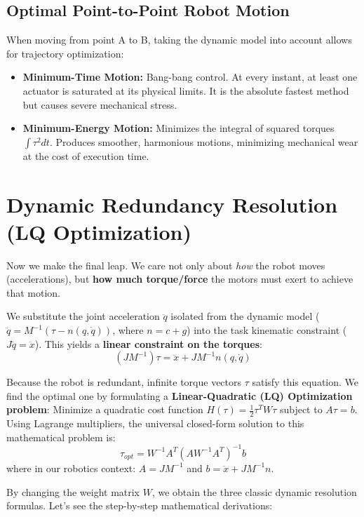 \documentclass[11pt,a4paper]{article}
\begin{document}
\subsection{Optimal Point-to-Point Robot Motion}
When moving from point A to B, taking the dynamic model into account allows for trajectory optimization:
\begin{itemize}
    \item \textbf{Minimum-Time Motion:} Bang-bang control. At every instant, at least one actuator is saturated at its physical limits. It is the absolute fastest method but causes severe mechanical stress.
    \item \textbf{Minimum-Energy Motion:} Minimizes the integral of squared torques $\int \tau^2 dt$. Produces smoother, harmonious motions, minimizing mechanical wear at the cost of execution time.
\end{itemize}

\section{Dynamic Redundancy Resolution (LQ Optimization)}
Now we make the final leap. We care not only about \textit{how} the robot moves (accelerations), but \textbf{how much torque/force} the motors must exert to achieve that motion. 

We substitute the joint acceleration $\ddot{q}$ isolated from the dynamic model ($\ddot{q} = M^{-1}(\tau - n(q, \dot{q}))$, where $n = c+g$) into the task kinematic constraint ($J\ddot{q} = \ddot{x}$). 
This yields a \textbf{linear constraint on the torques}:
\begin{equation}
    (J M^{-1}) \tau = \ddot{x} + J M^{-1} n(q, \dot{q})
\end{equation}

Because the robot is redundant, infinite torque vectors $\tau$ satisfy this equation. We find the optimal one by formulating a \textbf{Linear-Quadratic (LQ) Optimization problem}:
Minimize a quadratic cost function $H(\tau) = \frac{1}{2}\tau^T W \tau$ subject to $A\tau = b$.
Using Lagrange multipliers, the universal closed-form solution to this mathematical problem is:
\begin{equation}
    \tau_{opt} = W^{-1} A^T (A W^{-1} A^T)^{-1} b
\end{equation}
where in our robotics context: $A = JM^{-1}$ and $b = \ddot{x} + J M^{-1} n$.

By changing the weight matrix $W$, we obtain the three classic dynamic resolution formulas. Let's see the step-by-step mathematical derivations:
\end{document}
